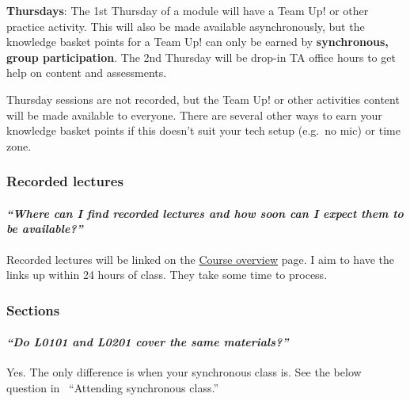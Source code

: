\documentclass[
  openany]{book}
\begin{document}
\textbf{Thursdays}: The 1st Thursday of a module will have a Team Up! or other practice activity. This will also be made available asynchronously, but the knowledge basket points for a Team Up! can only be earned by \textbf{synchronous, group participation}. The 2nd Thursday will be drop-in TA office hours to get help on content and assessments.

Thursday sessions are not recorded, but the Team Up! or other activities content will be made available to everyone. There are several other ways to earn your knowledge basket points if this doesn't suit your tech setup (e.g.~no mic) or time zone.

\hypertarget{recorded-lectures}{%
\subsubsection{Recorded lectures}\label{recorded-lectures}}

\hypertarget{where-can-i-find-recorded-lectures-and-how-soon-can-i-expect-them-to-be-available}{%
\paragraph{\texorpdfstring{\emph{``Where can I find recorded lectures and how soon can I expect them to be available?''}}{``Where can I find recorded lectures and how soon can I expect them to be available?''}}\label{where-can-i-find-recorded-lectures-and-how-soon-can-i-expect-them-to-be-available}}

Recorded lectures will be linked on the \href{https://q.utoronto.ca/courses/253305/pages/course-overview}{Course overview} page. I aim to have the links up within 24 hours of class. They take some time to process.

\hypertarget{sections}{%
\subsubsection{Sections}\label{sections}}

\hypertarget{do-l0101-and-l0201-cover-the-same-materials}{%
\paragraph{\texorpdfstring{\emph{``Do L0101 and L0201 cover the same materials?''}}{``Do L0101 and L0201 cover the same materials?''}}\label{do-l0101-and-l0201-cover-the-same-materials}}

Yes. The only difference is when your synchronous class is. See the below question in~ ``Attending synchronous class.''
\end{document}
